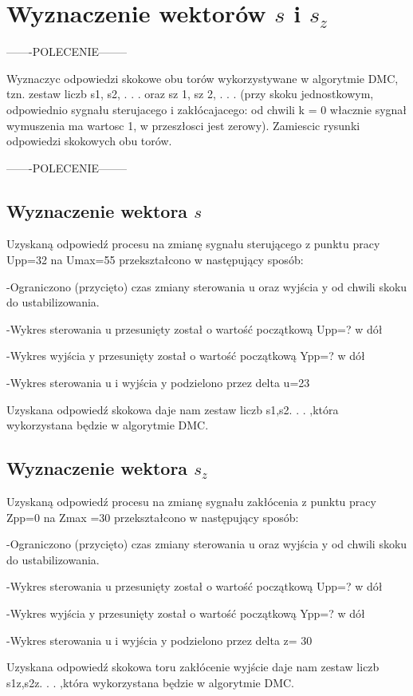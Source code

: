 \section{Wyznaczenie wektorów $s$ i $s_z$ }

-------POLECENIE--------

Wyznaczyc odpowiedzi skokowe obu torów wykorzystywane w algorytmie DMC, tzn.
zestaw liczb s1, s2, . . . oraz sz
1, sz
2, . . . (przy skoku jednostkowym, odpowiednio sygnału
sterujacego i zakłócajacego: od chwili k = 0 włacznie sygnał wymuszenia ma wartosc
1, w przeszłosci jest zerowy). Zamiescic rysunki odpowiedzi skokowych obu torów.

-------POLECENIE--------



\subsection{Wyznaczenie wektora $s$}

Uzyskaną odpowiedź procesu na zmianę sygnału sterującego z punktu pracy Upp=32 na
Umax=55 przekształcono w następujący sposób: 

-Ograniczono (przycięto) czas zmiany sterowania u oraz wyjścia y od chwili skoku do ustabilizowania.  

-Wykres sterowania u przesunięty został o wartość początkową Upp=? w dół 

-Wykres wyjścia y przesunięty został o wartość początkową Ypp=? w dół 

-Wykres sterowania u i wyjścia y podzielono przez delta u=23


Uzyskana odpowiedź skokowa daje nam zestaw liczb s1,s2. . . ,która wykorzystana będzie w algorytmie DMC.

\subsection{Wyznaczenie wektora $s_z$}

Uzyskaną odpowiedź procesu na zmianę sygnału zakłócenia z punktu pracy Zpp=0 na
Zmax =30 przekształcono w następujący sposób: 

-Ograniczono (przycięto) czas zmiany sterowania u oraz wyjścia y od chwili skoku do ustabilizowania. 

-Wykres sterowania u przesunięty został o wartość początkową Upp=? w dół 

-Wykres wyjścia y przesunięty został o wartość początkową Ypp=? w dół 

-Wykres sterowania u i wyjścia y podzielono przez delta z= 30


Uzyskana odpowiedź skokowa toru zakłócenie wyjście daje nam zestaw liczb s1z,s2z. . .
,która wykorzystana będzie w algorytmie DMC.

